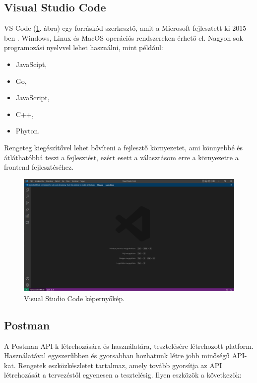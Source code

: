 \subsection{Visual Studio Code}

VS Code (\ref{fig:VSCode}. ábra) egy forráskód szerkesztő, amit a Microsoft fejlesztett ki 2015-ben \cite{VSCode}. Windows, Linux és MacOS operációs rendszereken érhető el. Nagyon sok programozási nyelvvel lehet használni, mint például:

\begin{itemize}
\item JavaScipt,
\item Go,
\item JavaScript,
\item C++,
\item Phyton.
\end{itemize}

Rengeteg kiegészítővel lehet bővíteni a fejlesztő környezetet, ami könnyebbé és átláthatóbbá teszi a fejlesztést, ezért esett a választásom erre a környezetre a frontend fejlesztéséhez.

\begin{figure}[h]
\centering
\includegraphics[scale=0.6]{images/VSCode.png}
\caption{Visual Studio Code képernyőkép.}
\label{fig:VSCode}
\end{figure}


\subsection{Postman}

A Postman \cite{Postman} API-k létrehozására és használatára, tesztelésére létrehozott platform. Használatával egyszerűbben és gyorsabban hozhatunk létre jobb minőségű API-kat. Rengetek eszközkészletet tartalmaz, amely tovább gyorsítja az API létrehozását a  tervezéstől egyenesen a tesztelésig. Ilyen eszközök a következők:

